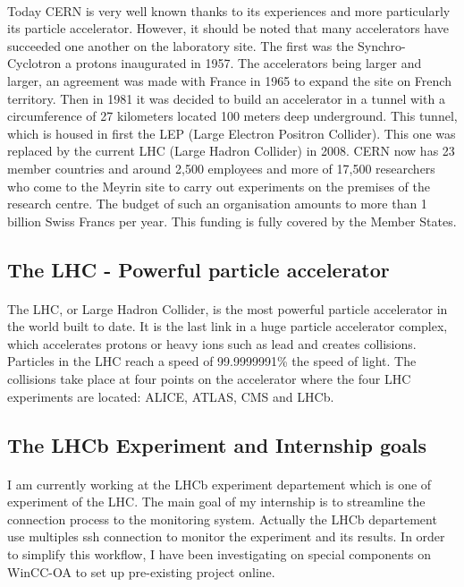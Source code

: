 \documentclass[a4paper, 12pt]{article}
\begin{document}
\paragraph{}
Today CERN is very well known thanks to its experiences and more particularly its particle accelerator. 
However, it should be noted that many accelerators have succeeded one another on the laboratory site. 
The first was the Synchro-Cyclotron a protons inaugurated in 1957. The accelerators being larger and larger, an agreement was made with France in 1965 to expand the site on French territory. 
Then in 1981 it was decided to build an accelerator in a tunnel with a circumference of 27 kilometers located 100 meters deep underground. 
This tunnel, which is housed in first the LEP (Large Electron Positron Collider). This one was replaced by the current LHC (Large Hadron Collider) in 2008. 
CERN now has 23 member countries and around 2,500 employees and more of 17,500 researchers who come to the Meyrin site to carry out experiments on the premises of the research centre. 
The budget of such an organisation amounts to more than 1 billion Swiss Francs per year.
This funding is fully covered by the Member States.

\subsection{The LHC - Powerful particle accelerator}
\paragraph{}
The LHC, or Large Hadron Collider, is the most powerful particle accelerator in the world built to date. 
It is the last link in a huge particle accelerator complex, which accelerates protons or heavy ions such as lead and creates collisions. 
Particles in the LHC reach a speed of 99.9999991\% the speed of light. 
The collisions take place at four points on the accelerator where the four LHC experiments are located: ALICE, ATLAS, CMS and LHCb.

\subsection{The LHCb Experiment and Internship goals}
\paragraph{}
I am currently working at the LHCb experiment departement which is one of experiment of the LHC.
The main goal of my internship is to streamline the connection process to the monitoring system. 
Actually the LHCb departement use multiples ssh connection to monitor the experiment and its results. 
In order to simplify this workflow, I have been investigating on special components on WinCC-OA to set up pre-existing project online.
\end{document}
